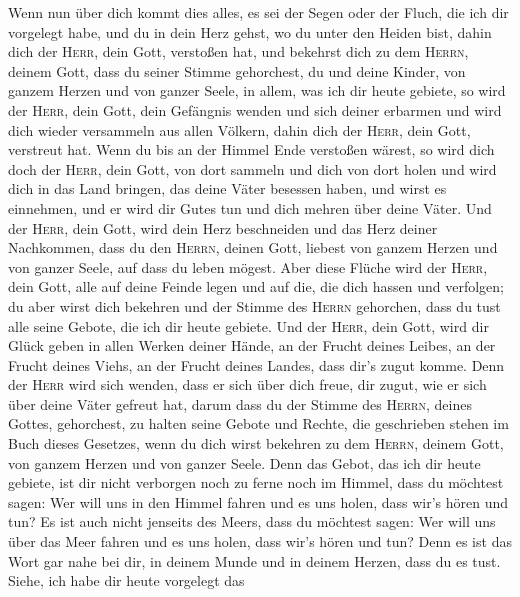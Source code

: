  Wenn nun über dich kommt dies alles, es sei der Segen
oder der Fluch, die ich dir vorgelegt habe, und du in dein Herz gehst,
wo du unter den Heiden bist, dahin dich der \textsc{Herr}, dein Gott,
verstoßen hat,  und bekehrst dich zu dem \textsc{Herrn},
deinem Gott, dass du seiner Stimme gehorchest, du und deine Kinder, von
ganzem Herzen und von ganzer Seele, in allem, was ich dir heute gebiete,
 so wird der \textsc{Herr}, dein Gott, dein Gefängnis
wenden und sich deiner erbarmen und wird dich wieder versammeln aus
allen Völkern, dahin dich der \textsc{Herr}, dein Gott, verstreut hat.
 Wenn du bis an der Himmel Ende verstoßen wärest, so wird
dich doch der \textsc{Herr}, dein Gott, von dort sammeln und dich von
dort holen  und wird dich in das Land bringen, das deine
Väter besessen haben, und wirst es einnehmen, und er wird dir Gutes tun
und dich mehren über deine Väter.  Und der \textsc{Herr},
dein Gott, wird dein Herz beschneiden und das Herz deiner Nachkommen,
dass du den \textsc{Herrn}, deinen Gott, liebest von ganzem Herzen und
von ganzer Seele, auf dass du leben mögest.  Aber diese
Flüche wird der \textsc{Herr}, dein Gott, alle auf deine Feinde legen
und auf die, die dich hassen und verfolgen;  du aber wirst
dich bekehren und der Stimme des \textsc{Herrn} gehorchen, dass du tust
alle seine Gebote, die ich dir heute gebiete.  Und der
\textsc{Herr}, dein Gott, wird dir Glück geben in allen Werken deiner
Hände, an der Frucht deines Leibes, an der Frucht deines Viehs, an der
Frucht deines Landes, dass dir's zugut komme. Denn der \textsc{Herr}
wird sich wenden, dass er sich über dich freue, dir zugut, wie er sich
über deine Väter gefreut hat,  darum dass du der Stimme
des \textsc{Herrn}, deines Gottes, gehorchest, zu halten seine Gebote
und Rechte, die geschrieben stehen im Buch dieses Gesetzes, wenn du dich
wirst bekehren zu dem \textsc{Herrn}, deinem Gott, von ganzem Herzen und
von ganzer Seele.  Denn das Gebot, das ich dir heute
gebiete, ist dir nicht verborgen noch zu ferne  noch im
Himmel, dass du möchtest sagen: Wer will uns in den Himmel fahren und es
uns holen, dass wir's hören und tun?  Es ist auch nicht
jenseits des Meers, dass du möchtest sagen: Wer will uns über das Meer
fahren und es uns holen, dass wir's hören und tun?  Denn
es ist das Wort gar nahe bei dir, in deinem Munde und in deinem Herzen,
dass du es tust.  Siehe, ich habe dir heute vorgelegt das

